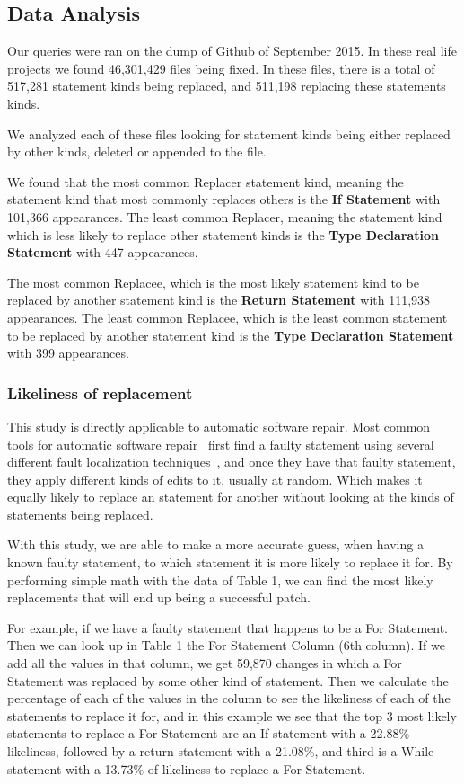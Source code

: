 \documentclass{sig-alternate-05-2015}
\begin{document}
\subsection{Data Analysis}
Our queries were ran on the dump of Github of September 2015. In these real life
projects we found 46,301,429 files being fixed. In these files, there is a total
of 517,281 statement kinds being replaced, and 511,198 replacing these
statements kinds.

We analyzed each of these files looking for statement kinds being either replaced by other kinds, deleted or appended to the file.

We found that the most common Replacer statement kind, meaning the statement
kind that most commonly replaces others is the \textbf{If Statement} with
101,366 appearances. The least common Replacer, meaning the statement kind which
is less likely to replace other statement kinds is the \textbf{Type Declaration
  Statement} with 447 appearances.

The most common Replacee, which is the most likely statement kind to be replaced
by another statement kind is the \textbf{Return Statement} with 111,938
appearances. The least common Replacee, which is the least common statement to
be replaced by another statement kind is the \textbf{Type Declaration Statement}
with 399 appearances.

\subsubsection{Likeliness of replacement}
This study is directly applicable to automatic software repair. Most common
tools for automatic software repair~\cite{kim2013,weimer2009,legoues2012}
first find a faulty statement using several different fault localization
techniques~\cite{fry2010}, and once they have that faulty statement, they apply
different kinds of edits to it, usually at random. Which makes it equally likely
to replace an statement for another without looking at the kinds of statements
being replaced.

With this study, we are able to make a more accurate guess, when having a known faulty statement, to which statement it is more likely to replace it for. By performing simple math with the data of Table 1, we can find the most likely replacements that will end up being a successful patch. 

For example, if we have a faulty statement that happens to be a For Statement. Then we can look up in Table 1 the For Statement Column (6th column). If we add all the values in that column, we get 59,870 changes in which a For Statement was replaced by some other kind of statement. Then we calculate the percentage of each of the values in the column to see the likeliness of each of the statements to replace it for, and in this example we see that the top 3 most likely statements to replace a For Statement are an If statement with a 22.88\% likeliness, followed by a return statement with a 21.08\%, and third is a While statement with a 13.73\% of likeliness to replace a For Statement.
\end{document}
